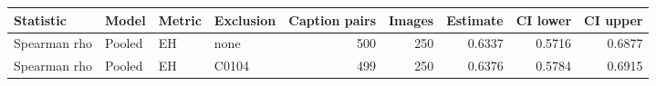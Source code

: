 \begin{tabular}{llllrrrrr}
\toprule
Statistic & Model & Metric & Exclusion & Caption pairs & Images & Estimate & CI lower & CI upper \\
\midrule
Spearman rho & Pooled & EH & none & 500 & 250 & 0.6337 & 0.5716 & 0.6877 \\
Spearman rho & Pooled & EH & C0104 & 499 & 250 & 0.6376 & 0.5784 & 0.6915 \\
\bottomrule
\end{tabular}

